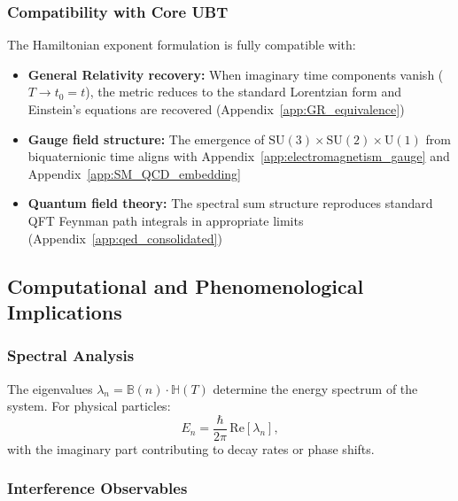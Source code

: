 \subsubsection{Compatibility with Core UBT}

The Hamiltonian exponent formulation is fully compatible with:

\begin{itemize}
\item \textbf{General Relativity recovery:} When imaginary time components vanish ($T \to t_0 = t$), the metric reduces to the standard Lorentzian form and Einstein's equations are recovered (Appendix~\ref{app:GR_equivalence})

\item \textbf{Gauge field structure:} The emergence of $\text{SU}(3) \times \text{SU}(2) \times \text{U}(1)$ from biquaternionic time aligns with Appendix~\ref{app:electromagnetism_gauge} and Appendix~\ref{app:SM_QCD_embedding}

\item \textbf{Quantum field theory:} The spectral sum structure reproduces standard QFT Feynman path integrals in appropriate limits (Appendix~\ref{app:qed_consolidated})
\end{itemize}

\subsection{Computational and Phenomenological Implications}

\subsubsection{Spectral Analysis}

The eigenvalues $\lambda_n = \mathbb{B}(n) \cdot \mathbb{H}(T)$ determine the energy spectrum of the system. For physical particles:
\begin{equation}
E_n = \frac{\hbar}{2\pi} \, \text{Re}[\lambda_n],
\label{eq:energy_spectrum}
\end{equation}
with the imaginary part contributing to decay rates or phase shifts.

\subsubsection{Interference Observables}

